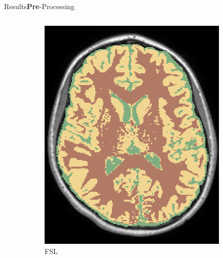 \documentclass[]{standalone}
\begin{document}
\begin{frame}{Results}{\textbf{Pre}-Processing}
\begin{columns}
\begin{column}{0.65\textwidth}
\begin{figure}[h!]
\begin{subfigure}{0.3\textwidth}
					\includegraphics[scale=0.11]{./IMG/FSL_SEG48.png}
					\caption*{\tiny FSL}
				\end{subfigure}
				\hfill
				\begin{subfigure}{0.3\textwidth}

\end{subfigure}
\end{figure}
\end{column}
\end{columns}
\end{frame}
\end{document}
